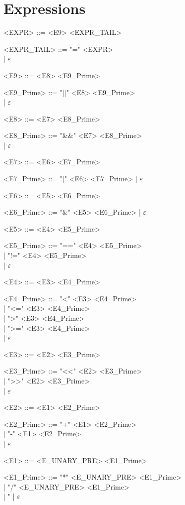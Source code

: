 \section{Expressions}
\begin{grammar}
      <EXPR> ::= <E9> <EXPR\_TAIL>

      <EXPR\_TAIL> ::= "=" <EXPR> \\
      | $\varepsilon$

      <E9> ::= <E8> <E9\_Prime>

      <E9\_Prime> ::= "||" <E8> <E9\_Prime> \\
      | $\varepsilon$

      <E8> ::= <E7> <E8\_Prime>

      <E8\_Prime> ::= "&&" <E7> <E8\_Prime> \\
      | $\varepsilon$

      <E7> ::= <E6> <E7\_Prime>

      <E7\_Prime> ::= "|" <E6> <E7\_Prime> | $\varepsilon$

      <E6> ::= <E5> <E6\_Prime>

      <E6\_Prime> ::= "&" <E5> <E6\_Prime> | $\varepsilon$

      <E5> ::= <E4> <E5\_Prime>

      <E5\_Prime> ::= "==" <E4> <E5\_Prime> \\
      | "!=" <E4> <E5\_Prime> \\
      | $\varepsilon$

      <E4> ::= <E3> <E4\_Prime>

      <E4\_Prime> ::= "<" <E3> <E4\_Prime> \\
      | "<=" <E3> <E4\_Prime> \\
      | ">" <E3> <E4\_Prime> \\
      | ">=" <E3> <E4\_Prime> \\
      | $\varepsilon$

      <E3> ::= <E2> <E3\_Prime>

      <E3\_Prime> ::= "<<" <E2> <E3\_Prime> \\
      | ">>" <E2> <E3\_Prime> \\
      | $\varepsilon$

      <E2> ::= <E1> <E2\_Prime>

      <E2\_Prime> ::= "+" <E1> <E2\_Prime> \\
      | "-" <E1> <E2\_Prime> \\
      | $\varepsilon$

      <E1> ::= <E\_UNARY\_PRE> <E1\_Prime>

      <E1\_Prime> ::= "*" <E\_UNARY\_PRE> <E1\_Prime> \\
      | "/" <E\_UNARY\_PRE> <E1\_Prime> \\
      | "%
      | $\varepsilon$
\end{grammar}

